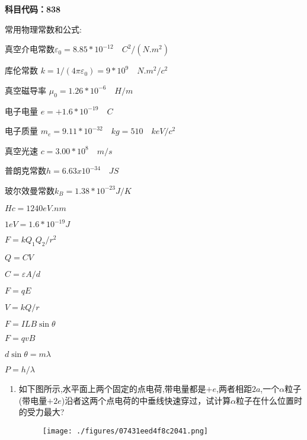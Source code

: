 
\textbf{科目代码：838}

常用物理常数和公式:

真空介电常数$\varepsilon_0=8.85 *10^{-12} \quad C^2/(N.m^2)$

库伦常数 $k=1/(4\pi \varepsilon_0)=9*10^9 \quad N.m^2/c^2$

真空磁导率 $\mu_0=1.26*10^{-6}\quad H/m$

电子电量 $e=+1.6*10^{-19}\quad C$

电子质量 $m_e=9.11*10^{-32}\quad kg=510 \quad keV/c^2$

真空光速 $c=3.00* 10^8 \quad m/s$

普朗克常数$h=6.63x10^{-34}\quad JS$

玻尔效曼常数$k_B =1.38*10^{-23}J/K$

$Hc=1240 eV.nm$

$1 eV=1.6*10^{-19}J$

$F=k Q_1 Q_2/r^2$

$Q=CV$

$C=\varepsilon A/d$

$F=qE$

$V=kQ/r$

$F=ILB\sin \theta$

$F=qvB$

$d\sin \theta =m\lambda $

$P=h/\lambda$

\begin{enumerate}
\item 如下图所示,水平面上两个固定的点电荷,带电量都是$+e$,两者相距$ 2a$,一个$\alpha $粒子(带电量$+2e$)沿者这两个点电荷的中垂线快速穿过，试计算$\alpha$粒子在什么位置时的受力最大?
\begin{figure}[ht]
\centering
\texttt{[image: ./figures/07431eed4f8c2041.png]}
\caption{} \label{fig_SD12_1}
\end{figure}
\end{enumerate}